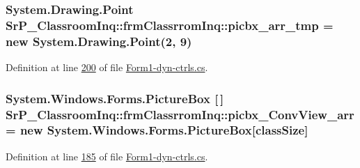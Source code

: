 \hypertarget{class_sr_p___classroom_inq_1_1frm_classrrom_inq_a019be294be5d02bea4369298d2a135db}{
\subsubsection[{picbx\-\_\-arr\-\_\-tmp}]{\setlength{\rightskip}{0pt plus 5cm}\-System.\-Drawing.\-Point {\bf \-Sr\-P\-\_\-\-Classroom\-Inq\-::frm\-Classrrom\-Inq\-::picbx\-\_\-arr\-\_\-tmp} = new \-System.\-Drawing.\-Point(2, 9)}}
\label{class_sr_p___classroom_inq_1_1frm_classrrom_inq_a019be294be5d02bea4369298d2a135db}


\-Definition at line \hyperlink{_form1-dyn-ctrls_8cs_source_l00200}{200} of file \hyperlink{_form1-dyn-ctrls_8cs_source}{\-Form1-\/dyn-\/ctrls.\-cs}.

\hypertarget{class_sr_p___classroom_inq_1_1frm_classrrom_inq_a4d179283a68569b1220534d91ddcf6d1}{
\subsubsection[{picbx\-\_\-\-Conv\-View\-\_\-arr}]{\setlength{\rightskip}{0pt plus 5cm}\-System.\-Windows.\-Forms.\-Picture\-Box \mbox{[}$\,$\mbox{]} {\bf \-Sr\-P\-\_\-\-Classroom\-Inq\-::frm\-Classrrom\-Inq\-::picbx\-\_\-\-Conv\-View\-\_\-arr} = new \-System.\-Windows.\-Forms.\-Picture\-Box\mbox{[}{\bf class\-Size}\mbox{]}}}
\label{class_sr_p___classroom_inq_1_1frm_classrrom_inq_a4d179283a68569b1220534d91ddcf6d1}


\-Definition at line \hyperlink{_form1-dyn-ctrls_8cs_source_l00185}{185} of file \hyperlink{_form1-dyn-ctrls_8cs_source}{\-Form1-\/dyn-\/ctrls.\-cs}.

